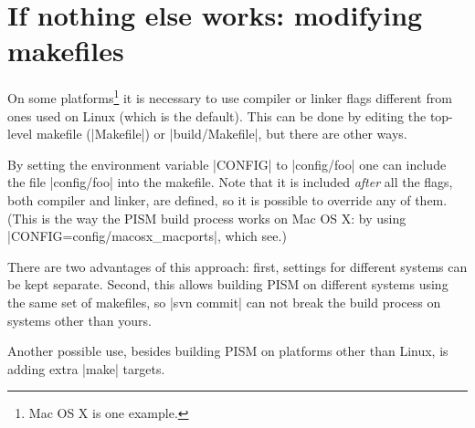 \documentclass[11pt,final]{amsart}
\begin{document}
\clearpage
\section{If nothing else works: modifying makefiles}
\label{sec:config}

On some platforms\footnote{Mac OS X is one example.} it is necessary to use compiler or linker flags different from ones used on
Linux (which is the default). This can be done by editing the top-level makefile (|Makefile|) or |build/Makefile|, but there are
other ways.

By setting the environment variable |CONFIG| to |config/foo| one can include the file |config/foo| into the makefile.
Note that it is included \emph{after} all the flags, both compiler and linker, are defined, so it is possible to override any of
them. (This is the way the PISM build process works on Mac OS X: by using |CONFIG=config/macosx_macports|, which see.)

There are two advantages of this approach: first, settings for different systems can be kept separate. Second, this allows
building PISM on different systems using the same set of makefiles, so |svn commit| can not break the build process on systems
other than yours.

Another possible use, besides building PISM on platforms other than Linux, is adding extra |make| targets.

\clearpage
\end{document}
